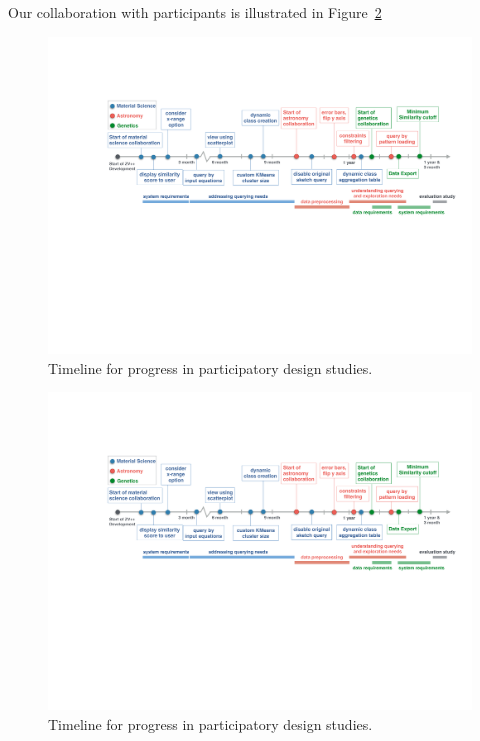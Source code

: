  \npar Our collaboration with participants is illustrated in Figure~\ref{timeline}
 \begin{figure}[h!]
 	\centering
   \includegraphics[width=\linewidth]{figures/timeline.pdf}
 	\caption{Timeline for progress in participatory design studies.}
 	\label{timeline}
 \end{figure}
 \begin{figure}[h!]
 	\centering
   \includegraphics[width=\linewidth]{figures/timeline.pdf}
 	\caption{Timeline for progress in participatory design studies.}
 	\label{timeline}
 \end{figure}

